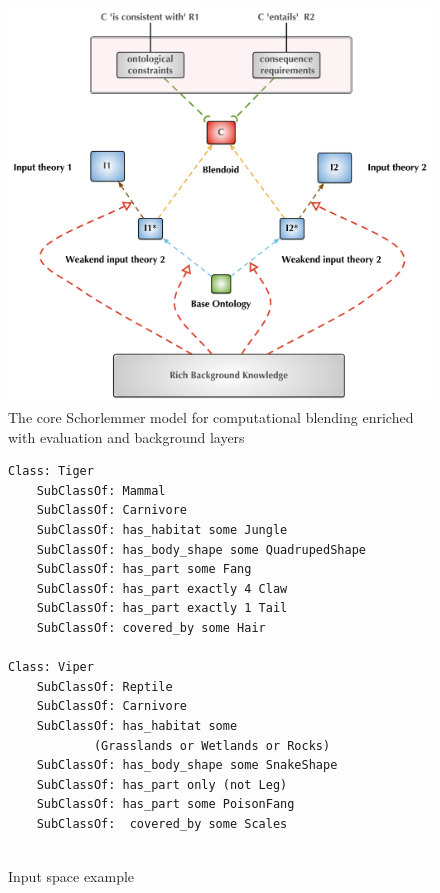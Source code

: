 \documentclass[letterpaper]{article}
\begin{document}
 
 \begin{figure}[htbp]
\begin{center}
\includegraphics[width=0.9 \textwidth]{blendoids-coremodel}
\caption{The core Schorlemmer model for computational blending enriched with evaluation and background layers}
\label{blendingModel}
\end{center}
\end{figure}

 \begin{figure}[htbp]
\begin{lstlisting}[basicstyle=\ttfamily\scriptsize,language=dolText,morekeywords={props,excluding,ObjectProperty,Class,DisjointUnionOf,SubClassOf,Characteristics,Transitive,Asymmetric,SubPropertyOf,DisjointClasses,EquivalentTo,Asymmetric,inverse,only,forall,iff,if,or,exists,bridge,distributed},escapechar=@,mathescape,alsolanguage=owl2Manchester]
Class: Tiger 
	SubClassOf: Mammal 
	SubClassOf: Carnivore 
	SubClassOf: has_habitat some Jungle 	
	SubClassOf: has_body_shape some QuadrupedShape
	SubClassOf: has_part some Fang 
	SubClassOf: has_part exactly 4 Claw
	SubClassOf: has_part exactly 1 Tail  
	SubClassOf: covered_by some Hair
	
Class: Viper
	SubClassOf: Reptile 
	SubClassOf: Carnivore 
	SubClassOf: has_habitat some 
			(Grasslands or Wetlands or Rocks)
	SubClassOf: has_body_shape some SnakeShape
	SubClassOf: has_part only (not Leg)
	SubClassOf: has_part some PoisonFang
	SubClassOf:  covered_by some Scales 	
	
\end{lstlisting}
\caption{Input space example}
\label{inputExample}
\end{figure}
\vspace{-2em}
 
\end{document}
